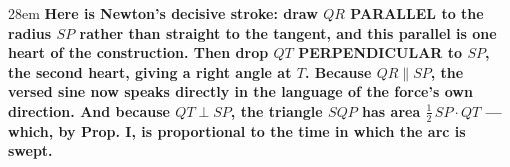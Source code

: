 \documentclass[border=4pt]{standalone}
\begin{document}
\begin{varwidth}{28em}
\large\bfseries
Here is Newton's decisive stroke: draw $QR$ PARALLEL to the radius $SP$ rather than straight to      the tangent, and this parallel is one heart of the construction. Then drop $QT$ PERPENDICULAR to      $SP$, the second heart, giving a right angle at $T$. Because $QR\parallel SP$, the versed sine now speaks      directly in the language of the force's own direction. And because $QT\perp SP$, the triangle $SQP$ has      area $\tfrac{1}{2}\,SP\cdot QT$ — which, by Prop. I, is proportional to the time in which the arc is swept.
\end{varwidth}
\end{document}

